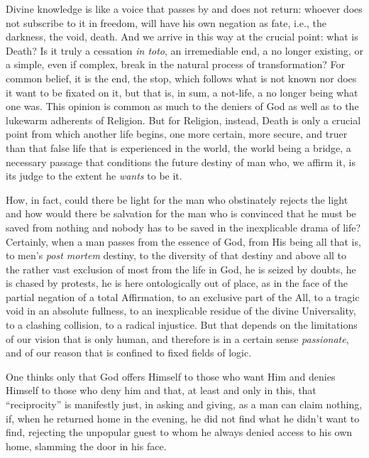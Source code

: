 Divine knowledge is like a voice that passes by and does not return: whoever does not subscribe to it in freedom, will have his own negation as fate, i.e., the darkness, the void, death. And we arrive in this way at the crucial point: what is Death? Is it truly a cessation \emph{in toto}, an irremediable end, a no longer existing, or a simple, even if complex, break in the natural process of transformation? For common belief, it is the end, the stop, which follows what is not known nor does it want to be fixated on it, but that is, in sum, a not-life, a no longer being what one was. This opinion is common as much to the deniers of God as well as to the lukewarm adherents of Religion. But for Religion, instead, Death is only a crucial point from which another life begins, one more certain, more secure, and truer than that false life that is experienced in the world, the world being a bridge, a necessary passage that conditions the future destiny of man who, we affirm it, is its judge to the extent he \emph{wants} to be it.

How, in fact, could there be light for the man who obstinately rejects the light and how would there be salvation for the man who is convinced that he must be saved from nothing and nobody has to be saved in the inexplicable drama of life? Certainly, when a man passes from the essence of God, from His being all that is, to men's \emph{post mortem} destiny, to the diversity of that destiny and above all to the rather vast exclusion of most from the life in God, he is seized by doubts, he is chased by protests, he is here ontologically out of place, as in the face of the partial negation of a total Affirmation, to an exclusive part of the All, to a tragic void in an absolute fullness, to an inexplicable residue of the divine Universality, to a clashing collision, to a radical injustice. But that depends on the limitations of our vision that is only human, and therefore is in a certain sense
\emph{passionate}, and of our reason that is confined to fixed fields of logic.

One thinks only that God offers Himself to those who want Him and denies Himself to those who deny him and that, at least and only in this, that ``reciprocity'' is manifestly just, in asking and giving, as a man can claim nothing, if, when he returned home in the evening, he did not find what he didn't want to find, rejecting the unpopular guest to whom he always denied access to his own home, slamming the door in his face.

